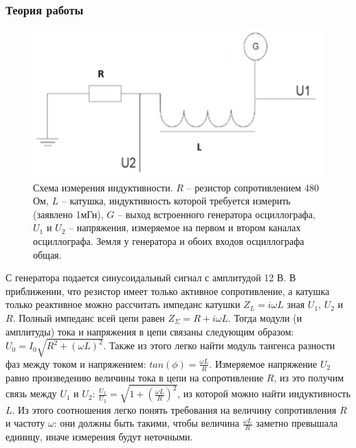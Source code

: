 \documentclass[a4paper,14pt]{extarticle}
\begin{document}
			\subsubsection{Теория работы}
				\begin{figure}[h]
					\centering
					\includegraphics[width=.75\linewidth]{схема.png}
					\caption{Схема измерения индуктивности. $R$ – резистор сопротивлением 480 Ом, $L$ – катушка, индуктивность которой требуется измерить (заявлено 1мГн), $G$ – выход встроенного	генератора осциллографа, $U_1$ и $U_2$ – напряжения, измеряемое на первом и втором каналах осциллографа. Земля у генератора и обоих входов осциллографа общая.}
					\label{fig1}
				\end{figure}
				\newpage
				С генератора подается синусоидальный сигнал с амплитудой 12 В. В приближении, что резистор имеет только активное сопротивление, а катушка только реактивное можно рассчитать импеданс катушки $Z_L = i \omega L$ зная $U_1$, $U_2$ и $R$. Полный импеданс всей цепи равен $Z_\Sigma =	R + i \omega L$. Тогда модули (и амплитуды) тока и напряжения в цепи связаны следующим образом: $U_0 = I_0 \sqrt{R^2 + (\omega L)^2}$. Также из этого легко найти модуль тангенса разности фаз между током и напряжением: $tan(\phi) = \frac{\omega L}{R}$. Измеряемое напряжение $U_2$ равно произведению величины тока в цепи на сопротивление $R$, из это получим связь между $U_1$ и $U_2$: $\frac{U_1}{U_2} = \sqrt{1 + (\frac{\omega L}{R})^2}$, из которой можно найти индуктивность $L$. Из этого соотношения легко понять требования на величину сопротивления $R$ и частоту $\omega$: они должны быть такими, чтобы величина $\frac{\omega L}{R}$ заметно превышала единицу, иначе измерения будут неточными.
\end{document}
